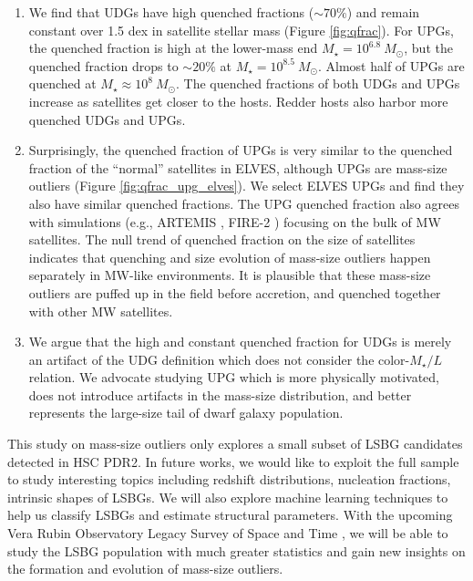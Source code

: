 \documentclass[twocolumn,astrosymb,twocolappendix]{aastex631}
\begin{document}
\begin{CJK*}{UTF8}{gbsn}
\begin{enumerate}
    \item We find that UDGs have high quenched fractions ($\sim 70\%$) and remain constant over 1.5 dex in satellite stellar mass (Figure \ref{fig:qfrac}). For UPGs, the quenched fraction is high at the lower-mass end $M_\star = 10^{6.8}\ M_\odot$, but the quenched fraction drops to $\sim 20\%$ at $M_\star = 10^{8.5}\ M_\odot$. Almost half of UPGs are quenched at $M_\star \approx 10^{8}\ M_\odot$. The quenched fractions of both UDGs and UPGs increase as satellites get closer to the hosts. Redder hosts also harbor more quenched UDGs and UPGs. 
    
    \item Surprisingly, the quenched fraction of UPGs is very similar to the quenched fraction of the ``normal'' satellites in ELVES, although UPGs are mass-size outliers (Figure \ref{fig:qfrac_upg_elves}). We select ELVES UPGs and find they also have similar quenched fractions. The UPG quenched fraction also agrees with simulations (e.g., ARTEMIS \citealt{Font2022}, FIRE-2 \citealt{Samuel2022}) focusing on the bulk of MW satellites. The null trend of quenched fraction on the size of satellites indicates that quenching and size evolution of mass-size outliers happen separately in MW-like environments. It is plausible that these mass-size outliers are puffed up in the field before accretion, and quenched together with other MW satellites. 
    
    \item We argue that the high and constant quenched fraction for UDGs is merely an artifact of the UDG definition which does not consider the color-$M_\star/L$ relation. We advocate studying UPG which is more physically motivated, does not introduce artifacts in the mass-size distribution, and better represents the large-size tail of dwarf galaxy population. 
\end{enumerate}

This study on mass-size outliers only explores a small subset of LSBG candidates detected in HSC PDR2. In future works, we would like to exploit the full sample to study interesting topics including redshift distributions, nucleation fractions, intrinsic shapes of LSBGs. We will also explore machine learning techniques to help us classify LSBGs and estimate structural parameters. With the upcoming Vera Rubin Observatory Legacy Survey of Space and Time \citep[LSST, ][]{lsst2009,LSST2019}, we will be able to study the LSBG population with much greater statistics and gain new insights on the formation and evolution of mass-size outliers. 



\end{CJK*}
\end{document}
